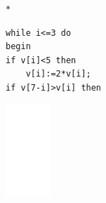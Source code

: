 \documentclass[10pt]{article}
\begin{document}
\begin{verbatim}
*
\end{verbatim}

\begin{verbatim}
while i<=3 do
begin
if v[i]<5 then
    v[i]:=2*v[i];
if v[7-i]>v[i] then
\end{verbatim}

\begin{center}
\includegraphics[max width=\textwidth]{2025_04_17_46e04c6acd873ea9558dg-142(9)}
\end{center}
\end{document}
